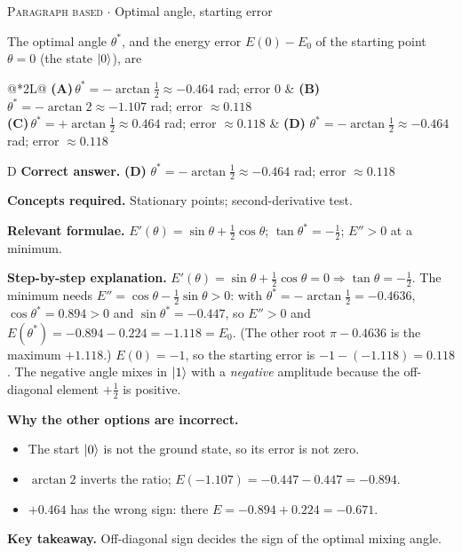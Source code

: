 \documentclass[11pt,a4paper]{article}
\newcommand{\optlabel}[1]{\textbf{(#1)}}
\newcommand{\correctlabel}[1]{\textcolor{okgreen}{\textbf{(#1)}\,\ding{51}}}
\newenvironment{qitem}[1]{\begin{list}{}{\setlength{\leftmargin}{3.3em}\setlength{\labelwidth}{3.1em}%
  \setlength{\labelsep}{0.2em}\setlength{\topsep}{3pt}\setlength{\parsep}{3pt}}\item[\textbf{Q.#1}\hfill]}{\end{list}}
\newcommand{\qsep}{\par\vspace{2pt}{\color{black!15}\hrule}\vspace{4pt}}
\newcommand{\qmeta}[2]{{\footnotesize\color{black!60}\textsc{#1} \;$\cdot$\; #2}\par}
\begin{document}
\begin{qitem}{15}
\qmeta{Paragraph based}{Optimal angle, starting error}
The optimal angle $\theta^*$, and the energy error $E(0) - E_0$ of the starting point $\theta = 0$ (the state $\ket0$), are
\par\smallskip\noindent\begin{tabularx}{\linewidth}{@{}*{2}{L}@{}}
\optlabel{A}\,$\theta^* = -\arctan\tfrac12 \approx -0.464$ rad; error $0$ & \optlabel{B}\,$\theta^* = -\arctan 2 \approx -1.107$ rad; error $\approx 0.118$ \\[3pt]
\optlabel{C}\,$\theta^* = +\arctan\tfrac12 \approx 0.464$ rad; error $\approx 0.118$ & \correctlabel{D}\,$\theta^* = -\arctan\tfrac12 \approx -0.464$ rad; error $\approx 0.118$
\end{tabularx}
\end{qitem}
\begin{solbox}{D}
\textbf{\color{brand}Correct answer.} \textcolor{okgreen}{\textbf{(D)}} $\theta^* = -\arctan\tfrac12 \approx -0.464$ rad; error $\approx 0.118$

\textbf{\color{brand}Concepts required.} Stationary points; second-derivative test.

\textbf{\color{brand}Relevant formulae.} $E'(\theta) = \sin\theta + \frac12\cos\theta$; $\tan\theta^* = -\frac12$; $E'' > 0$ at a minimum.

\textbf{\color{brand}Step-by-step explanation.} $E'(\theta) = \sin\theta + \tfrac12\cos\theta = 0 \Rightarrow \tan\theta = -\tfrac12$. The minimum needs $E'' = \cos\theta - \tfrac12\sin\theta > 0$: with
$\theta^* = -\arctan\tfrac12 = -0.4636$, $\cos\theta^* = 0.894 > 0$ and $\sin\theta^* = -0.447$, so $E'' > 0$ and
$E(\theta^*) = -0.894 - 0.224 = -1.118 = E_0$. (The other root $\pi - 0.4636$ is the maximum $+1.118$.)
$E(0) = -1$, so the starting error is $-1 - (-1.118) = 0.118$. The negative angle mixes in $\ket1$ with a \emph{negative} amplitude because the
off-diagonal element $+\tfrac12$ is positive.

\textbf{\color{brand}Why the other options are incorrect.}
\begin{itemize}[leftmargin=2.4em, itemsep=1pt, topsep=2pt]
\item[\textbf{(A)}] The start $\ket0$ is not the ground state, so its error is not zero.
\item[\textbf{(B)}] $\arctan2$ inverts the ratio; $E(-1.107) = -0.447 - 0.447 = -0.894$.
\item[\textbf{(C)}] $+0.464$ has the wrong sign: there $E = -0.894 + 0.224 = -0.671$.
\end{itemize}
\textbf{\color{brand}Key takeaway.} Off-diagonal sign decides the sign of the optimal mixing angle.
\end{solbox}
\qsep
\end{document}
